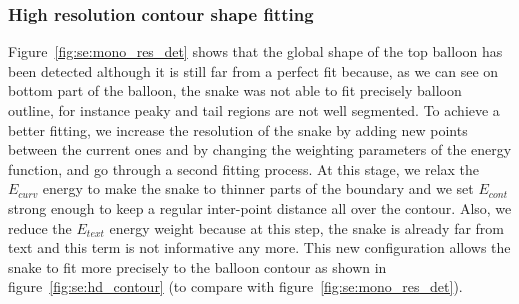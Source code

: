 

\subsubsection{High resolution contour shape fitting}
Figure~\ref{fig:se:mono_res_det} shows that the global shape of the top balloon has been detected although it is still far from a perfect fit because, as we can see on bottom part of the balloon, the snake was not able to fit precisely balloon outline, for instance peaky and tail regions are not well segmented.
To achieve a better fitting, we increase the resolution of the snake by adding new points between the current ones and by changing the weighting parameters of the energy function, and go through a second fitting process.
At this stage, we relax the $E_{curv}$ energy to make the snake to thinner parts of the boundary and we set $E_{cont}$ strong enough to keep a regular inter-point distance all over the contour.
Also, we reduce the $E_{text}$ energy weight because at this step, the snake is already far from text and this term is not informative any more.
This new configuration allows the snake to fit more precisely to the balloon contour as shown in figure~\ref{fig:se:hd_contour} (to compare with figure~\ref{fig:se:mono_res_det}).

